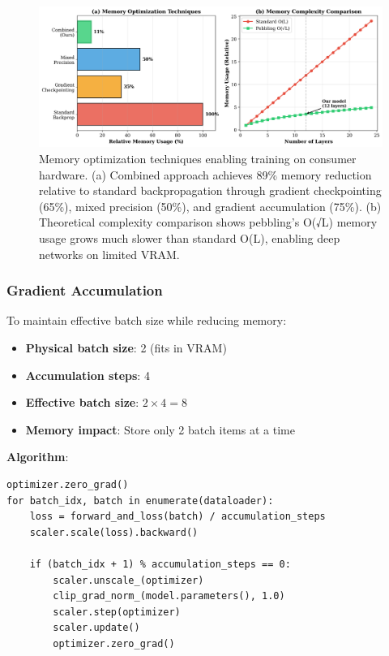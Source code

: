 \documentclass[12pt]{article}
\begin{document}
\begin{figure}[h]
\centering
\includegraphics[width=\textwidth]{figure5_memory_optimization.png}
\caption{Memory optimization techniques enabling training on consumer hardware. (a) Combined approach achieves 89\% memory reduction relative to standard backpropagation through gradient checkpointing (65\%), mixed precision (50\%), and gradient accumulation (75\%). (b) Theoretical complexity comparison shows pebbling's O(√L) memory usage grows much slower than standard O(L), enabling deep networks on limited VRAM.}
\label{fig:pebbling}
\end{figure}

\subsubsection{Gradient Accumulation}

To maintain effective batch size while reducing memory:

\begin{itemize}
\item \textbf{Physical batch size}: 2 (fits in VRAM)
\item \textbf{Accumulation steps}: 4
\item \textbf{Effective batch size}: $2 \times 4 = 8$
\item \textbf{Memory impact}: Store only 2 batch items at a time
\end{itemize}

\textbf{Algorithm}:
\begin{verbatim}
optimizer.zero_grad()
for batch_idx, batch in enumerate(dataloader):
    loss = forward_and_loss(batch) / accumulation_steps
    scaler.scale(loss).backward()

    if (batch_idx + 1) % accumulation_steps == 0:
        scaler.unscale_(optimizer)
        clip_grad_norm_(model.parameters(), 1.0)
        scaler.step(optimizer)
        scaler.update()
        optimizer.zero_grad()
\end{verbatim}
\end{document}
